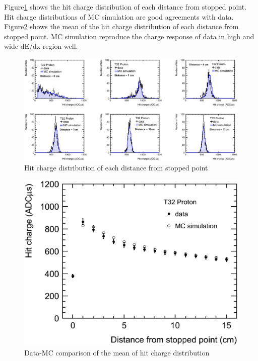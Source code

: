 Figure\ref{fig:ADC_distribution} shows the hit charge distribution of each distance from stopped point.
Hit charge distributions of MC simulation are good agreements with data.
Figure\ref{fig:Mean_comparison} shows the mean of the hit charge distribution of each distance from stopped point.
MC simulation reproduce the charge response of data in high and wide dE/dx region well.

\begin{figure}[htbp]
  \centering
  \includegraphics[width=0.8\hsize,clip]{fig/stop_proton2.eps}
  \caption{Hit charge distribution of each distance from stopped point}
  \label{fig:ADC_distribution}
\end{figure}

\begin{figure}[htbp]
  \begin{center}
  \includegraphics[width=1.0\hsize,clip]{fig/stop_proton3.eps}
  \end{center}
  \caption{Data-MC comparison of the mean of hit charge distribution}
  \label{fig:Mean_comparison}
\end{figure}



